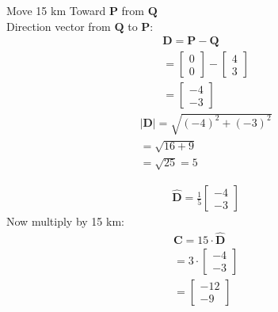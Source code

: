 \documentclass{beamer}
\begin{document}
\begin{frame}
Move 15 km Toward $\mathbf{P}$ from $\mathbf{Q}$\\
Direction vector from $\mathbf{Q}$ to $\mathbf{P}$:
\begin{align}
\mathbf{D} = \mathbf{P} - \mathbf{Q}\\
= \begin{bmatrix} 0 \\ 0 \end{bmatrix} - \begin{bmatrix} 4 \\ 3 \end{bmatrix} \\
= \begin{bmatrix} -4 \\ -3 \end{bmatrix}
\end{align}
\begin{align}
|\mathbf{D}| = \sqrt{(-4)^2 + (-3)^2}\\
= \sqrt{16 + 9} \\
= \sqrt{25} = 5
\end{align}
\end{frame}
\begin{frame}
\begin{align}
\hat{\mathbf{D}} = \frac{1}{5} \begin{bmatrix} -4 \\ -3 \end{bmatrix}
\end{align}
Now multiply by 15 km:
\begin{align}
\mathbf{C} = 15 \cdot \hat{\mathbf{D}}\\ = 3 \cdot \begin{bmatrix} -4 \\ -3 \end{bmatrix} \\
= \begin{bmatrix} -12 \\ -9 \end{bmatrix}
\end{align}
\end{frame}
\end{document}
